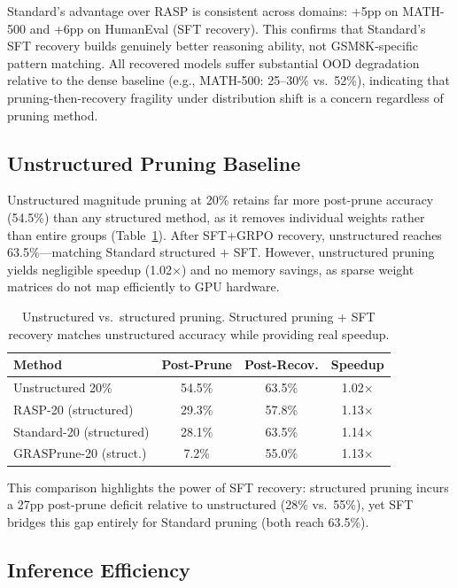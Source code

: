 \documentclass[11pt,a4paper]{article}
\begin{document}
Standard's advantage over RASP is consistent across domains: +5pp on MATH-500 and +6pp on HumanEval (SFT recovery). This confirms that Standard's SFT recovery builds genuinely better reasoning ability, not GSM8K-specific pattern matching. All recovered models suffer substantial OOD degradation relative to the dense baseline (e.g., MATH-500: 25--30\% vs.\ 52\%), indicating that pruning-then-recovery fragility under distribution shift is a concern regardless of pruning method.


\subsection{Unstructured Pruning Baseline}
\label{sec:unstructured}

Unstructured magnitude pruning at 20\% retains far more post-prune accuracy (54.5\%) than any structured method, as it removes individual weights rather than entire groups (Table~\ref{tab:unstructured}). After SFT+GRPO recovery, unstructured reaches 63.5\%---matching Standard structured + SFT. However, unstructured pruning yields negligible speedup (1.02$\times$) and no memory savings, as sparse weight matrices do not map efficiently to GPU hardware.

\begin{table}[t]
\centering
\small
\begin{tabular}{lccc}
\toprule
\textbf{Method} & \textbf{Post-Prune} & \textbf{Post-Recov.} & \textbf{Speedup} \\
\midrule
Unstructured 20\% & 54.5\% & 63.5\% & 1.02$\times$ \\
RASP-20 (structured) & 29.3\% & 57.8\% & 1.13$\times$ \\
Standard-20 (structured) & 28.1\% & 63.5\% & 1.14$\times$ \\
GRASPrune-20 (struct.) & 7.2\% & 55.0\% & 1.13$\times$ \\
\bottomrule
\end{tabular}
\caption{Unstructured vs.\ structured pruning. Structured pruning + SFT recovery matches unstructured accuracy while providing real speedup.}
\label{tab:unstructured}
\end{table}

This comparison highlights the power of SFT recovery: structured pruning incurs a 27pp post-prune deficit relative to unstructured (28\% vs.\ 55\%), yet SFT bridges this gap entirely for Standard pruning (both reach 63.5\%).


\subsection{Inference Efficiency}
\label{sec:speedup}
\end{document}
